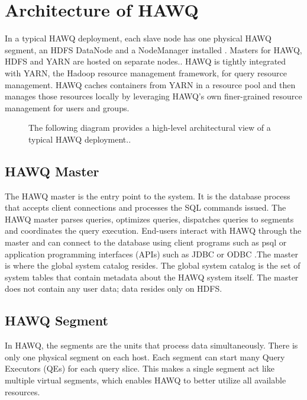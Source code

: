 \documentclass[9pt,twocolumn,twoside]{../../styles/osajnl}
\begin{document}
\section{Architecture of HAWQ}

{In a typical HAWQ deployment, each slave node has one physical HAWQ
segment, an HDFS DataNode and a NodeManager installed \CE. Masters for
HAWQ, HDFS and YARN are hosted on separate
nodes.}\cite{www-hawq-architecture}. HAWQ is tightly integrated with
YARN, the Hadoop resource management
framework, for query resource management. HAWQ caches containers from
YARN in a resource pool and then manages those resources locally by
leveraging HAWQ’s own finer-grained resource management for users and
groups.

\begin{figure}[htbp]
	\centering
	\caption{{The following diagram provides a high-level
	architectural view of a typical HAWQ
	deployment.}\cite{www-hawq-arch-image}.}
	\label{fig:false-color}
\end{figure}

\subsection{HAWQ Master}

The HAWQ master is the entry point to the system. It is the database
process that accepts client connections and processes the SQL
commands issued. The HAWQ master parses queries, optimizes queries,
dispatches queries to segments and coordinates the query execution.
End-users interact with HAWQ through the master and can connect to
the database using client programs such as psql or application
programming interfaces (APIs) such as JDBC \CE or ODBC \CE.The master is
where the global system catalog resides. The global system catalog is
the set of system tables that contain metadata about the HAWQ system
itself. The master does not contain any user data; data resides only
on HDFS.

\subsection{HAWQ Segment}

In HAWQ, the segments are the units that process data simultaneously.
There is only one physical segment on each host. Each segment can
start many Query Executors (QEs) for each query slice. This makes a
single segment act like multiple virtual segments, which enables HAWQ
to better utilize all available resources.
\end{document}
